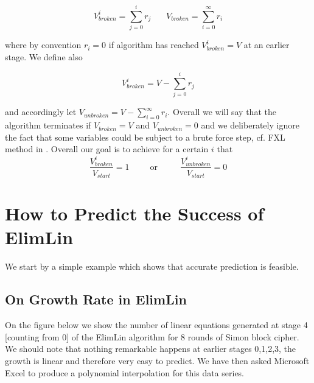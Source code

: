 \begin{equation}
V^i_{broken}=\sum_{j=0}^{i} r_j ~~~~~~~~V_{broken}=\sum_{i=0}^{\infty} r_i
\end{equation}

where by convention $r_i=0$ if algorithm has reached
$V^i_{broken}=V$ at an earlier stage.
We define also

\begin{equation}
V^i_{broken}=V-\sum_{j=0}^{i} r_j
\end{equation}

and accordingly let
$
V_{unbroken}=V-\sum_{i=0}^{\infty} r_i.
$
Overall we will say that the algorithm terminates if
$V_{broken}=V$ and $V_{unbroken}=0$ and we deliberately ignore the fact that
some variables could be subject to a brute force step,
cf. FXL method in \cite{XL2}.
Overall our goal is to achieve for a certain $i$ that
\begin{equation}
\frac{V^i_{broken}}{V_{start}}=1
~~~~~~~~~~~\mbox{or}~~~~~~~~~~~~
\frac{V^i_{unbroken}}{V_{start}}=0
\end{equation}



\section{How to Predict the Success of ElimLin}

We start by a simple example which shows that accurate prediction is feasible.

\subsection{On Growth Rate in ElimLin}
\label{SuperLinearGrowth}

On the figure below we show the number of linear equations generated at stage 4 [counting from 0]
of the ElimLin algorithm for 8 rounds of Simon block cipher.
We should note that nothing remarkable happens at earlier stages 0,1,2,3,
the growth is linear and therefore very easy to predict.
We have then asked Microsoft Excel to produce a polynomial interpolation for this data series.

